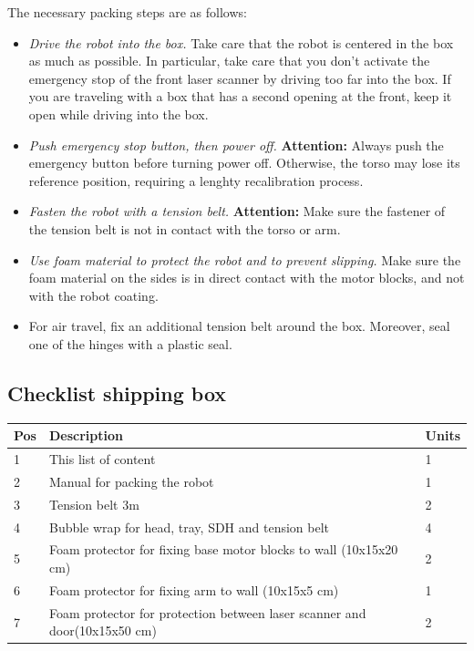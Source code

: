 The necessary packing steps are as follows:
\begin{itemize}
\item {\em Drive the robot into the box.} Take care that the robot is centered in the box as much as possible. In particular, take care that you don't activate the emergency stop of the front laser scanner
by driving too far into the box. If you are traveling with a box that has a second opening at the front, keep it open while driving into the box.
\item {\em Push emergency stop button, then power off.} {\bf Attention:} Always push the emergency button before turning power off. Otherwise, the torso may lose its reference position, requiring a lenghty recalibration process.
\item {\em Fasten the robot with a tension belt.} {\bf Attention:} Make sure the fastener of the tension belt is not in contact with the torso or arm. 
\item {\em Use foam material to protect the robot and to prevent slipping.} Make sure the foam material on the sides is in direct contact with the motor blocks, and not with the robot coating.
\item For air travel, fix an additional tension belt around the box. Moreover, seal one of the hinges with a plastic seal.
\end{itemize}

\newpage

\subsection{Checklist shipping box}\label{sec:shippingbox}

\begin{center}
\begin{tabular}{|l|p{10cm}|l|}
\hline
\textbf{Pos} & \textbf{Description} & \textbf{Units}\\
\hline\hline
1 & This list of content & 1\\
2 & Manual for packing the robot & 1\\
3 & Tension belt 3m & 2\\
4 & Bubble wrap for head, tray, SDH and tension belt & 4\\
5 & Foam protector for fixing base motor blocks to wall (10x15x20 cm) & 2\\
6 & Foam protector for fixing arm to wall (10x15x5 cm) & 1\\
7 & Foam protector for protection between laser scanner and door(10x15x50 cm) & 2\\
\hline
\end{tabular}
\end{center}

